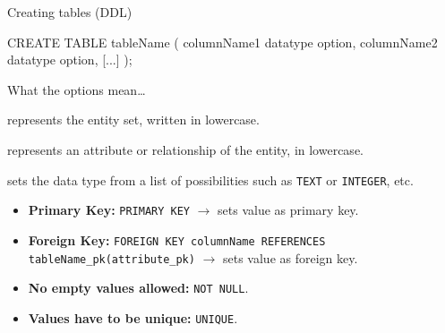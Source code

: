 \begin{frame}[fragile]{Creating tables (DDL)}
\begin{sqlcode}
CREATE TABLE tableName (
  columnName1 datatype option,
  columnName2 datatype option,
  [...]
  );
\end{sqlcode}
\begin{exampleblock}{What the options mean\dots}
\begin{description}\footnotesize
  \item[tableName] represents the entity set, written in lowercase.
  \item[columnName] represents an attribute or relationship of the entity, in lowercase. 
  \item[datatype] sets the data type from a list of possibilities such as \texttt{TEXT} or \texttt{INTEGER}, etc.
  \item[options] 
  \begin{itemize}
      \item \textbf{Primary Key:} \texttt{PRIMARY KEY} $\to$ sets value as primary key.
      \item \textbf{Foreign Key:} \texttt{FOREIGN KEY columnName REFERENCES tableName\_pk(attribute\_pk)} $\to$ sets value as foreign key.
      \item \textbf{No empty values allowed:} \texttt{NOT NULL}.
      \item \textbf{Values have to be unique:} \texttt{UNIQUE}.
  \end{itemize}
\end{description}
\end{exampleblock}
\end{frame}





